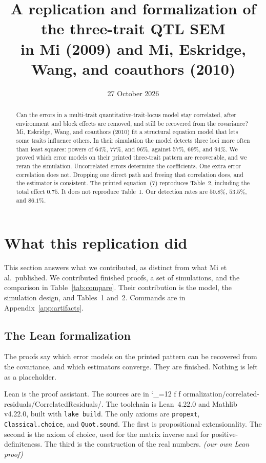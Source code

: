 \documentclass[11pt]{article}
\title{A replication and formalization of the three-trait QTL SEM\\
in Mi (2009) and Mi, Eskridge, Wang, and coauthors (2010)}
\author{}
\date{27 October 2026}
\makeatletter
\newcommand{\sha}{\begingroup\catcode`\_=12 \sha@read}
\newcommand{\sha@read}[1]{\ttfamily\sha@loop#1\relax\endgroup}
\def\sha@loop#1{%
  \ifx\relax#1\else
    #1\allowbreak
    \expandafter\sha@loop
  \fi}
\newcommand{\ev}[1]{\textup{\emph{(#1)}}}
\makeatother
\begin{document}
\maketitle

\begin{abstract}
Can the errors in a multi-trait quantitative-trait-locus model stay correlated,
after environment and block effects are removed, and still be recovered from
the covariance? Mi, Eskridge, Wang, and coauthors (2010) fit a structural
equation model that lets some traits influence others. In their simulation
the model detects three loci more often than least squares: powers of 64\%,
77\%, and 96\%, against 57\%, 69\%, and 94\%. We proved which error models
on their printed three-trait pattern are recoverable, and we reran the
simulation. Uncorrelated errors determine the coefficients. One extra error
correlation does not. Dropping one direct path and freeing that correlation
does, and the estimator is consistent. The printed equation~(7)
reproduces Table~2, including the total effect $0.75$. It does not
reproduce Table~1. Our detection rates are $50.8\%$, $53.5\%$, and $86.1\%$.
\end{abstract}

\section{What this replication did}
\label{sec:did}

This section answers what we contributed, as distinct from what Mi et al.\
published. We contributed finished proofs, a set of simulations, and the
comparison in Table~\ref{tab:compare}. Their contribution is the model, the
simulation design, and Tables~1 and~2. Commands are in
Appendix~\ref{app:artifacts}.

\subsection{The Lean formalization}

The proofs say which error models on the printed pattern can be recovered
from the covariance, and which estimators converge. They are finished.
Nothing is left as a placeholder.

Lean is the proof assistant. The sources are in
\sha{formalization/correlated-residuals/CorrelatedResiduals/}.
The toolchain is Lean~4.22.0 and Mathlib v4.22.0, built with
\texttt{lake build}. The only axioms are \texttt{propext},
\texttt{Classical.choice}, and \texttt{Quot.sound}. The first is
propositional extensionality. The second is the axiom of choice, used for
the matrix inverse and for positive-definiteness. The third is the
construction of the real numbers. \ev{our own Lean proof}
\end{document}
